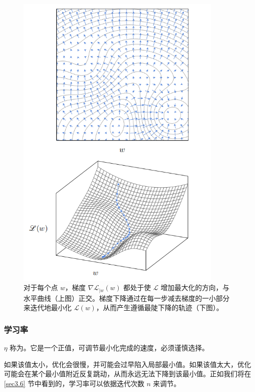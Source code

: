 \begin{figure}
    \centering
    \includegraphics[width=0.9\textwidth]{fig/fig3.2.png}
    \caption[梯度下降]{对于每个点 $w$，梯度 $\nabla \mathcal{L}_{\mid w}(w)$ 都处于使 $\mathcal{L}$ 增加最大化的方向，与水平曲线（上图）正交。梯度下降通过在每一步减去梯度的一小部分来迭代地最小化 $\mathcal{L}(w)$，从而产生遵循最陡下降的轨迹（下图）。}
    \label{fig3.2}
\end{figure}

\subsubsection*{学习率}

 $\eta$ 称为。它是一个正值，可调节最小化完成的速度，必须谨慎选择。

如果该值太小，优化会很慢，并可能会过早陷入局部最小值。如果该值太大，优化可能会在某个最小值附近反复跳动，从而永远无法下降到该最小值。正如我们将在 \ref{sec3.6} 节中看到的，学习率可以依据迭代次数 $n$ 来调节。


